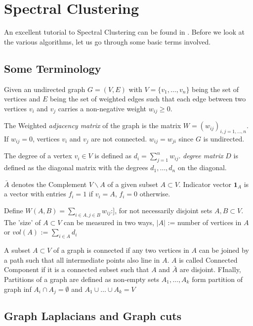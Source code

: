 \documentclass[10pt,a4paper, nocenter]{report}
\begin{document}
    \chapter{Spectral Clustering}
    An excellent tutorial to Spectral Clustering can be found in \cite{Luxburg2007}. Before we look at the various algorithms, let us go through some basic terms involved.

    \section{Some Terminology}

        Given an undirected graph $G=(V,E)$ with $V=\{v_{1},\dots,v_{n}\}$ being the set of vertices and $E$ being the set of weighted edges such that each edge between two vertices $v_{i}$ and $v_{j}$ carries a non-negative weight $w_{ij} \ge 0$.

        The Weighted \textit{adjacency matrix} of the graph is the matrix $W=(w_{ij})_{i,j=1,\dots,n}$. If $w_{ij}=0$, vertices $v_{i}$ and $v_{j}$ are not connected. $w_{ij}=w_{ji}$ since $G$ is undirected. 

        The degree of a vertex $v_{i}\in V$ is defined as $ d_{i} = \sum_{j=1}^{n}w_{ij}$. \textit{degree matrix} $D$ is defined as the diagonal matrix with the degrees $d_{1} ,\dots, d_{n}$ on the diagonal. 

        $\bar{A}$ denotes the Complement $V \backslash A$  of a given subset $A \subset V$. Indicator vector $\mathbf{1}_{A}$ is a vector with entries $f_{i} = 1$ if $v_{i}=A$, $f_{i}=0$ otherwise.

        Define $W(A,B) = \sum_{i\in A, j\in B}w_{ij}$:], for not necessarily disjoint sets $A, B \subset V$.
        The 'size' of $A \subset V$ can be measured in two ways, $\lvert A \rvert$ := number of vertices in $A$ or $vol(A)$ := $\sum_{i\in A}d_{i}$

        A subset $A \subset V$ of a graph is connected if any two vertices in $A$ can be joined by a path such that all intermediate points also line in $A$. $A$ is called Connected Component if it is a connected subset such that $A$ and $\bar{A}$ are disjoint. FInally, Partitions of a graph are defined as non-empty sets $A_{1},\dots,A_{k}$ form partition of graph inf $A_{i} \cap A_{j} = \emptyset$ and $A_{1}\cup \dots \cup A_{k} = V$

    \section{Graph Laplacians and Graph cuts}
\end{document}
